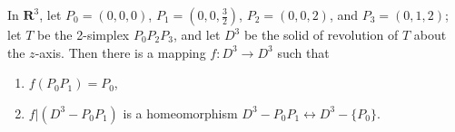 In $\mathbf{R}^3$, let $P_0 = (0, 0, 0)$, $P_1 = (0, 0, \frac{3}{2})$, $P_2 = (0, 0, 2)$, and $P_3 = (0, 1, 2)$; let $T$ be the 2-simplex $P_0P_2P_3$, and let $D^3$ be the solid of revolution of $T$ about the $z$-axis. Then there is a mapping $f: D^3 \rightarrow D^3$ such that
\begin{enumerate}
\item $f(P_0P_1) = P_0$,
\item $f|(D^3 - P_0P_1)$ is a homeomorphism $D^3 - P_0P_1 \leftrightarrow D^3 - \{P_0\}$.
\end{enumerate}
